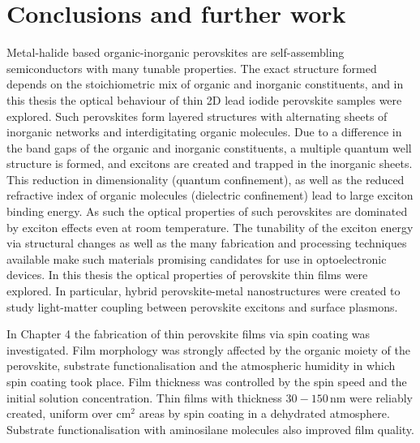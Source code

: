 
\chapter{Conclusions and further work}

\graphicspath{{Chapter8/Figures/}}

Metal-halide based organic-inorganic perovskites are self-assembling semiconductors with many tunable properties. The exact structure formed depends on the stoichiometric mix of organic and inorganic constituents, and in this thesis the optical behaviour of thin 2D lead iodide perovskite samples were explored. Such perovskites form layered structures with alternating sheets of inorganic  networks and interdigitating organic molecules. Due to a difference in the band gaps of the organic and inorganic constituents, a multiple quantum well structure is formed, and excitons are created and trapped in the inorganic sheets. This reduction in dimensionality (quantum confinement), as well as the reduced refractive index of organic molecules (dielectric confinement) lead to large exciton binding energy. As such the optical properties of such perovskites are dominated by exciton effects even at room temperature. The tunability of the exciton energy via structural changes as well as the many fabrication and processing techniques available make such materials promising candidates for use in optoelectronic devices. In this thesis the optical properties of perovskite thin films were explored. In particular, hybrid perovskite-metal nanostructures were created to study light-matter coupling between perovskite excitons and surface plasmons.

In Chapter 4 the fabrication of thin perovskite films via spin coating was investigated. Film morphology was strongly affected by the organic moiety of the perovskite, substrate functionalisation and the atmospheric humidity in which spin coating took place. Film thickness was controlled by the spin speed and the initial solution concentration. Thin films with thickness $30-150$\,nm were reliably created, uniform over cm$^2$ areas by spin coating in a dehydrated atmosphere. Substrate functionalisation with aminosilane molecules also improved film quality.

